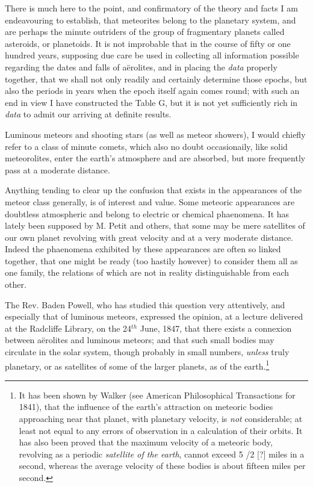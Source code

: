 \documentclass[a4paper, 12pt, oneside]{article}
\begin{document}
There is much here to the point, and confirmatory of the theory and facts I am endeavouring to establish, that meteorites belong to the planetary system, and are perhaps the minute outriders of the group of fragmentary planets called asteroids, or planetoids. It is not improbable that in the course of fifty or one hundred years, supposing due care be used in collecting all information possible regarding the dates and falls of aërolites, and in placing the \emph{data} properly together, that we shall not only readily and certainly determine those epochs, but also the periods in years when the epoch itself again comes round; with such an end in view I have constructed the Table G, but it is not yet sufficiently rich in \emph{data} to admit our arriving at definite results.

Luminous meteors and shooting stars (as well as meteor showers), I would chiefly refer to a class of minute comets, which also no doubt occasionaily, like solid meteorolites, enter the earth's atmosphere and are absorbed, but more frequently pass at a moderate distance.

Anything tending to clear up the confusion that exists in the appearances of the meteor class generally, is of interest and value. Some meteoric appearances are doubtless atmospheric and belong to electric or chemical phaenomena. It has lately been supposed by M. Petit and others, that some may be mere satellites of our own planet revolving with great velocity and at a very moderate distance. Indeed the phaenomena exhibited by these appearances are often so linked together, that one might be ready (too hastily however) to consider them all as one family, the relations of which are not in reality distinguishable from each other.

The Rev. Baden Powell, who has studied this question very attentively, and especially that of luminous meteors, expressed the opinion, at a lecture delivered at the Radcliffe Library, on the 24$^{th}$ June, 1847, that there exists a connexion between aërolites and luminous meteors; and that such small bodies may circulate in the solar system, though probably in small numbers, \emph{unless} truly planetary, or as satellites of some of the larger planets, as of the earth.\footnote{It has been shown by Walker (see American Philosophical Transactions for 1841), that the influence of the earth's attraction on meteoric bodies approaching near that planet, with planetary velocity, is \emph{not} considerable; at least not equal to any errors of observation in a calculation of their orbits. It has also been proved that the maximum velocity of a meteoric body, revolving as a periodic \emph{satellite of the earth}, cannot exceed 5 /2 [?] miles in a second, whereas the average velocity of these bodies is about fifteen miles per second.}
\end{document}
